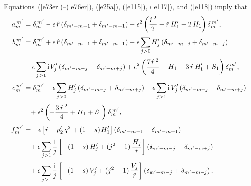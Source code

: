 \documentclass[12pt,prb,aps,notitlepage]{revtex4-1}
\begin{document}
Equations~(\ref{e73er})--(\ref{e76er}), (\ref{e25a}), (\ref{e115}), (\ref{e117}), and (\ref{e118}) imply that
\begin{align}\label{e120}
a_m^{\,m'} &= \delta_{m}^{\,m'} -\epsilon\,\hat{r}\left(\delta_{m'-m-1}+\delta_{m'-m+1}\right)-\epsilon^2\left(\frac{\hat{r}^{\,2}}{2}-\hat{r}\,H_1'-2\,H_1\right)\delta_m^{\,m'},\\[0.5ex]
b_m^{\,m'}&= \delta_m^{\,m'}+\epsilon\,\hat{r}\left(\delta_{m'-m-1}+\delta_{m'-m+1}\right)-\epsilon\sum_{j>0}H_j'\left(\delta_{m'-m-j}+\delta_{m'-m+j}\right)\nonumber\\[0.5ex]
&- \epsilon\sum_{j>1}{\rm i}\,V_j'\left(\delta_{m'-m-j} - \delta_{m'-m+j}\right)+ \epsilon^2\left(\frac{7\,\hat{r}^{\,2}}{4} - H_1 -3\,\hat{r}\,H_1' + S_1\right)\delta_{m}^{\,m'},\\[0.5ex]
c_m^{\,m'} &= \delta_m^{\,m'}-\epsilon\sum_{j>0}H_j'\left(\delta_{m'-m-j}+\delta_{m'-m+j}\right)- \epsilon\sum_{j>1}{\rm i}\,V_j'\left(\delta_{m'-m-j} - \delta_{m'-m+j}\right)\nonumber\\[0.5ex]
&\phantom{=}+ \epsilon^2\left(-\frac{3\,\hat{r}^{\,2}}{4} + H_1 + S_1\right)\delta_{m}^{\,m'},\\[0.5ex]
f_m^{\,m'} &= -\epsilon\left[\hat{r} - p_2'\,q^2+ (1-s)\,H_1'\right]\left(\delta_{m'-m-1}-\delta_{m'-m+1}\right) \nonumber\\[0.5ex]
&\phantom{=}+ \epsilon\sum_{j>1}\frac{1}{j}\left[-(1-s)\,H_j'+(j^2-1)\,\frac{H_j}{\hat{r}}\right]\left(\delta_{m'-m-j}-\delta_{m'-m+j}\right)\nonumber\\[0.5ex]
&\phantom{=}+ \epsilon\sum_{j>1}\frac{{\rm i}}{j}\left[-(1-s)\,V_j'+(j^2-1)\,\frac{V_j}{\hat{r}}\right]
\left(\delta_{m'-m-j}+\delta_{m'-m+j}\right).\label{e123}
\end{align}
\end{document}

